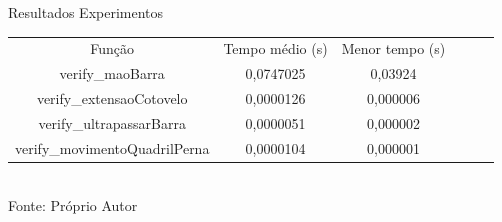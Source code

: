 \begin{frame}{Resultados Experimentos}
    \fontsize{7pt}{8pt}\selectfont
    \begin{table}[H]
    \centering
    \begin{tabular}{@{}cccccc@{}}
    \toprule
    \\ \midrule
    Função & Tempo médio (s) & Menor tempo (s) \\
    \midrule
    verify\_maoBarra & 0,0747025 & 0,03924 \\
    verify\_extensaoCotovelo & 0,0000126 & 0,000006  \\
    verify\_ultrapassarBarra & 0,0000051 & 0,000002  \\
    verify\_movimentoQuadrilPerna & 0,0000104 & 0,000001  \\
    \bottomrule
    \end{tabular}
    \label{tab:tempos_funcoes_especificas}
    \\
    {Fonte: Próprio Autor}
    \end{table}
\end{frame}
